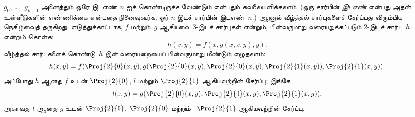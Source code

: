 \documentclass[../../../include/open-logic-section]{subfiles}
\begin{document}
$g_0$, \dots,~$g_{k-1}$ அனைத்தும் ஒரே இடஎண்~$n$ ஐக்
கொண்டிருக்க வேண்டும் என்பதும் கவலையளிக்கலாம். (ஒரு சார்பின்
\emph{இடஎண்} என்பது அதன் உள்ளீடுகளின் எண்ணிக்கை என்பதை நினைவுகூர்க;
ஓர் $n$-இடச் சார்பின் இடஎண்~$n$.) ஆனால் வீழ்த்தல் சார்புகளைச்
சேர்ப்பது விரும்பிய நெகிழ்வைத் தருகிறது. எடுத்துக்காட்டாக,
$f$ மற்றும்~$g$ ஆகியவை $3$-இடச் சார்புகள் என்றும், பின்வருமாறு
வரையறுக்கப்படும் $2$-இடச் சார்பு~$h$ என்றும் கொள்க:
\[
h(x,y) = f(x,g(x,x,y),y).
\]
வீழ்த்தல் சார்புகளைக் கொண்டு~$h$ இன் வரையறையைப் பின்வருமாறு
மீண்டும் எழுதலாம்:
\[
h(x,y) = f(\Proj{2}{0}(x,y), g(\Proj{2}{0}(x,y), \Proj{2}{0}(x,y),
\Proj{2}{1}(x,y)), \Proj{2}{1}(x,y)).
\]
அப்போது $h$ ஆனது $f$ உடன் $\Proj{2}{0}$, $l$ மற்றும்
$\Proj{2}{1}$ ஆகியவற்றின் சேர்ப்பு; இங்கே
\[
l(x,y) = g(\Proj{2}{0}(x,y),\Proj{2}{0}(x,y),\Proj{2}{1}(x,y)),
\]
அதாவது $l$ ஆனது $g$ உடன் $\Proj{2}{0}$, $\Proj{2}{0}$ மற்றும்
~$\Proj{2}{1}$ ஆகியவற்றின் சேர்ப்பு.
\end{document}
